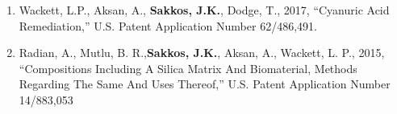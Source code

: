 



\begin{enumerate}
	\item Wackett, L.P., Aksan, A., \textbf{Sakkos, J.K.}, Dodge, T., 2017, “Cyanuric Acid Remediation,” U.S. Patent Application Number 62/486,491.
	\item {Radian, A., Mutlu, B. R.,\textbf{Sakkos, J.K.}, Aksan, A., Wackett, L. P., 2015, “Compositions Including A Silica Matrix And Biomaterial, Methods Regarding The Same And Uses Thereof,” U.S. Patent Application Number 14/883,053}
\end{enumerate}

